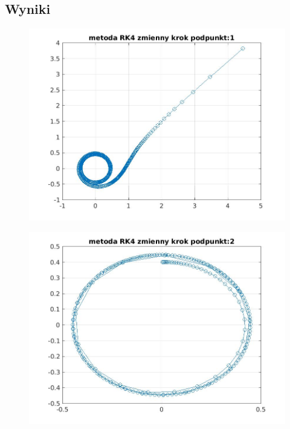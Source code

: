\documentclass[a4paper, 12pt]{article}
\begin{document}
\subsection{Wyniki}
\begin{figure}[H]
\centering
\includegraphics[width = 15cm]{2d/metoda RK4 zmienny krok podpunkt:1.jpg}
\end{figure}
\begin{figure}[H]
\centering
\includegraphics[width = 15cm]{2d/metoda RK4 zmienny krok podpunkt:2.jpg}
\end{figure}
\end{document}
